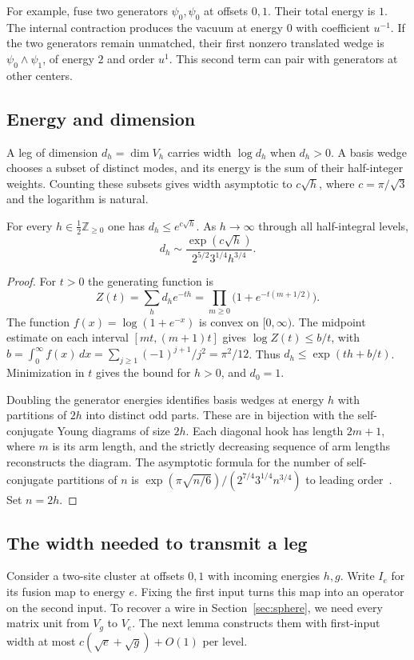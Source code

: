 For example, fuse two generators $\psi_0,\psi_0$ at offsets $0,1$.
Their total energy is $1$. The internal contraction produces the vacuum
at energy $0$ with coefficient $u^{-1}$. If the two generators remain
unmatched, their first nonzero translated wedge is
$\psi_0\wedge\psi_1$, of energy $2$ and order $u^1$. This second term
can pair with generators at other centers.

\subsection{Energy and dimension}
A leg of dimension $d_h=\dim V_h$ carries width $\log d_h$ when
$d_h>0$. A basis wedge chooses a subset of distinct modes, and its
energy is the sum of their half-integer weights. Counting these
subsets gives width asymptotic to $c\sqrt h$, where $c=\pi/\sqrt3$
and the logarithm is natural.

\begin{lemma}\label{lem:dimension}\label{lem:fermions-dimension}
For every $h\in\frac12\mathbb Z_{\ge0}$ one has $d_h\le e^{c\sqrt h}$.
As $h\to\infty$ through all half-integral levels,
\[
   d_h\sim
   \frac{\exp(c\sqrt h)}{2^{5/2}3^{1/4}h^{3/4}} .
\]
\end{lemma}

\begin{proof}
For $t>0$ the generating function is
\[
 Z(t)=\sum_h d_h e^{-th}
     =\prod_{m\ge0}\bigl(1+e^{-t(m+1/2)}\bigr).
\]
The function $f(x)=\log(1+e^{-x})$ is convex on $[0,\infty)$.
The midpoint estimate on each interval $[mt,(m+1)t]$ gives
$\log Z(t)\le b/t$, with
$b=\int_0^\infty f(x)\,dx=\sum_{j\ge1}(-1)^{j+1}/j^2=\pi^2/12$.
Thus $d_h\le \exp(th+b/t)$. Minimization in $t$ gives the bound for $h>0$,
and $d_0=1$.

Doubling the generator energies identifies basis wedges at energy $h$ with
partitions of $2h$ into distinct odd parts. These are in bijection with the
self-conjugate Young diagrams of size $2h$. Each diagonal hook has length
$2m+1$, where $m$ is its arm length, and the strictly decreasing sequence of
arm lengths reconstructs the diagram. The asymptotic formula for the number
of self-conjugate partitions of $n$ is
$\exp(\pi\sqrt{n/6})/(2^{7/4}3^{1/4}n^{3/4})$ to leading
order~\cite[Section~5.1]{Wildon}. Set $n=2h$.
\end{proof}

\subsection{The width needed to transmit a leg}
Consider a two-site cluster at offsets $0,1$ with incoming energies
$h,g$. Write $I_e$ for its fusion map to energy $e$. Fixing the first
input turns this map into an operator on the second input. To recover
a wire in Section~\ref{sec:sphere}, we need every matrix unit from
$V_g$ to $V_e$. The next lemma constructs them with first-input width
at most $c(\sqrt e+\sqrt g)+O(1)$ per level.

